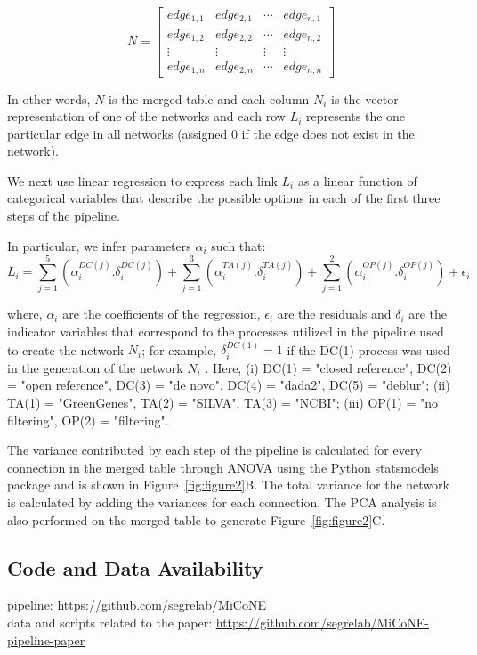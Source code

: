   \begin{equation*}
    N = \begin{bmatrix}
     edge_{1,1} & edge_{2,1} & \cdots  & edge_{n, 1} \\ 
     edge_{1,2} & edge_{2,2} & \cdots  & edge_{n, 2} \\ 
     \vdots & \vdots & \vdots  & \vdots \\ 
     edge_{1,n} & edge_{2,n} & \cdots  & edge_{n, n}
    \end{bmatrix}      
  \end{equation*}
  
  In other words, $N$ is the merged table and each column $N_i$ is the vector representation of one of the networks and each row $L_i$ represents the one particular edge in all networks (assigned 0 if the edge does not exist in the network).
      
  We next use linear regression to express each link $L_i$ as a linear function of categorical variables that describe the possible options in each of the first three steps of the pipeline.
  
  In particular, we infer parameters $\alpha_i$ such that:
   \begin{equation*}
       L_i = \sum_{j=1}^5 \left( \alpha^{DC(j)}_i.\delta^{DC(j)}_i \right) +
             \sum_{j=1}^3 \left( \alpha^{TA(j)}_i.\delta^{TA(j)}_i \right) +
             \sum_{j=1}^2 \left( \alpha^{OP(j)}_i.\delta^{OP(j)}_i \right) +
             \epsilon_i
   \end{equation*}
   
   where, $\alpha_i$ are the coefficients of the regression, $\epsilon_i$ are the residuals and $\delta_i$ are the indicator variables that correspond to the processes utilized in the pipeline used to create the network $N_i$; for example, $\delta^{DC(1)}_i = 1$ if the DC(1) process was used in the generation of the network $N_i$ .
   Here, (i) DC(1) = "closed reference", DC(2) = "open reference", DC(3) = "de novo", DC(4) = "dada2", DC(5) = "deblur"; (ii)  TA(1) = "GreenGenes", TA(2) = "SILVA", TA(3) = "NCBI"; (iii) OP(1) = "no filtering", OP(2) = "filtering".
   
  The variance contributed by each step of the pipeline is calculated for every connection in the merged table through ANOVA using the Python statsmodels package and is shown in Figure~\ref{fig:figure2}B.
  The total variance for the network is calculated by adding the variances for each connection.
  The PCA analysis is also performed on the merged table to generate Figure~\ref{fig:figure2}C.

  \subsection*{Code and Data Availability}
  pipeline: \href{https://github.com/segrelab/MiCoNE}{https://github.com/segrelab/MiCoNE} \\
  data and scripts related to the paper: \href{https://github.com/segrelab/MiCoNE-pipeline-paper}{https://github.com/segrelab/MiCoNE-pipeline-paper}